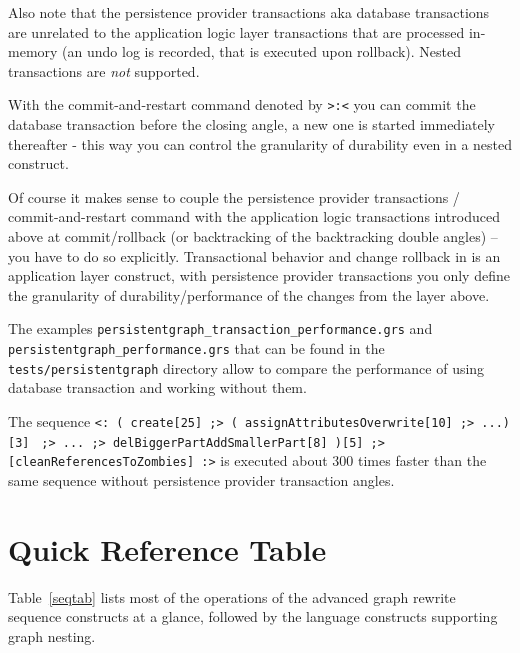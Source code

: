 Also note that the persistence provider transactions aka database transactions are unrelated to the application logic layer transactions that are processed in-memory (an undo log is recorded, that is executed upon rollback).
Nested transactions are \emph{not} supported.

With the commit-and-restart command denoted by \texttt{>:<} you can commit the database transaction before the closing angle, a new one is started immediately thereafter - this way you can control the granularity of durability even in a nested construct.

Of course it makes sense to couple the persistence provider transactions / commit-and-restart command with the application logic transactions introduced above at commit/rollback (or backtracking of the backtracking double angles) -- you have to do so explicitly. Transactional behavior and change rollback in \GrG{} is an application layer construct, with persistence provider transactions you only define the granularity of durability/performance of the changes from the layer above.

\begin{example}
The examples \texttt{persistentgraph\_transaction\_performance.grs} and \texttt{persistentgraph\_performance.grs} that can be found in the \texttt{tests/persistentgraph} directory allow to compare the performance of using database transaction and working without them.

The sequence
\verb#<: ( create[25] ;> ( assignAttributesOverwrite[10] ;> ...)[3]#
\verb# ;> ... ;> delBiggerPartAddSmallerPart[8] )[5] ;> [cleanReferencesToZombies] :>#
is executed about 300 times faster than the same sequence without persistence provider transaction angles.
\end{example}


\section{Quick Reference Table}

Table~\ref{seqtab} lists most of the operations of the advanced graph rewrite sequence constructs at a glance, followed by the language constructs supporting graph nesting.

